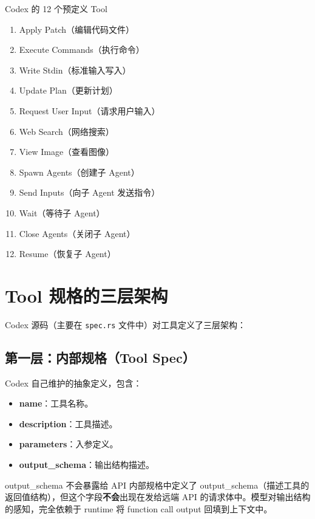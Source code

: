 \documentclass[a4paper]{article}
\begin{document}
\begin{knowledgebox}{Codex 的 12 个预定义 Tool}
\begin{enumerate}
    \item Apply Patch（编辑代码文件）
    \item Execute Commands（执行命令）
    \item Write Stdin（标准输入写入）
    \item Update Plan（更新计划）
    \item Request User Input（请求用户输入）
    \item Web Search（网络搜索）
    \item View Image（查看图像）
    \item Spawn Agents（创建子 Agent）
    \item Send Inputs（向子 Agent 发送指令）
    \item Wait（等待子 Agent）
    \item Close Agents（关闭子 Agent）
    \item Resume（恢复子 Agent）
\end{enumerate}
\end{knowledgebox}


\section{Tool 规格的三层架构}

Codex 源码（主要在 \texttt{spec.rs} 文件中）对工具定义了三层架构：

\subsection{第一层：内部规格（Tool Spec）}

Codex 自己维护的抽象定义，包含：
\begin{itemize}
    \item \textbf{name}：工具名称。
    \item \textbf{description}：工具描述。
    \item \textbf{parameters}：入参定义。
    \item \textbf{output\_schema}：输出结构描述。
\end{itemize}

\begin{warningbox}{output\_schema 不会暴露给 API}
内部规格中定义了 output\_schema（描述工具的返回值结构），但这个字段\textbf{不会}出现在发给远端 API 的请求体中。模型对输出结构的感知，完全依赖于 runtime 将 function call output 回填到上下文中。
\end{warningbox}
\end{document}
